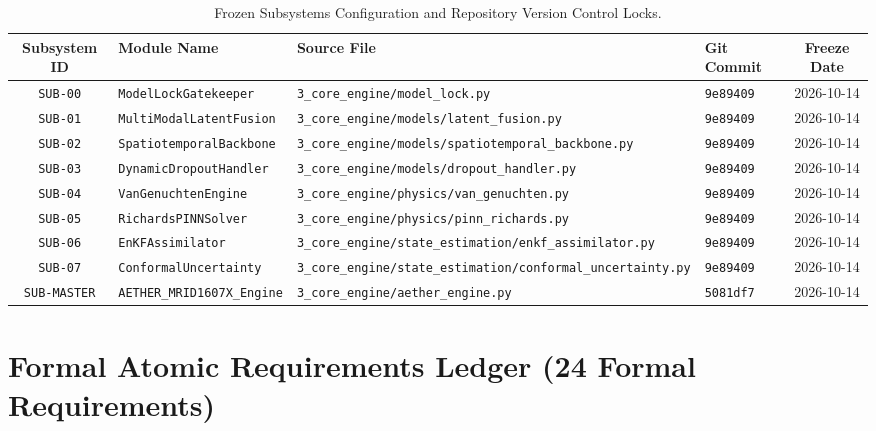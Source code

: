 \documentclass[11pt,a4paper]{article}
\theoremstyle{definition}
\theoremstyle{remark}
\begin{document}
\begin{table}[h!]
\centering
\small
\begin{tabular}{clllc}
\toprule
\textbf{Subsystem ID} & \textbf{Module Name} & \textbf{Source File} & \textbf{Git Commit} & \textbf{Freeze Date} \\
\midrule
\texttt{SUB-00} & \texttt{ModelLockGatekeeper} & \texttt{3\_core\_engine/model\_lock.py} & \texttt{9e89409} & 2026-10-14 \\
\texttt{SUB-01} & \texttt{MultiModalLatentFusion} & \texttt{3\_core\_engine/models/latent\_fusion.py} & \texttt{9e89409} & 2026-10-14 \\
\texttt{SUB-02} & \texttt{SpatiotemporalBackbone} & \texttt{3\_core\_engine/models/spatiotemporal\_backbone.py} & \texttt{9e89409} & 2026-10-14 \\
\texttt{SUB-03} & \texttt{DynamicDropoutHandler} & \texttt{3\_core\_engine/models/dropout\_handler.py} & \texttt{9e89409} & 2026-10-14 \\
\texttt{SUB-04} & \texttt{VanGenuchtenEngine} & \texttt{3\_core\_engine/physics/van\_genuchten.py} & \texttt{9e89409} & 2026-10-14 \\
\texttt{SUB-05} & \texttt{RichardsPINNSolver} & \texttt{3\_core\_engine/physics/pinn\_richards.py} & \texttt{9e89409} & 2026-10-14 \\
\texttt{SUB-06} & \texttt{EnKFAssimilator} & \texttt{3\_core\_engine/state\_estimation/enkf\_assimilator.py} & \texttt{9e89409} & 2026-10-14 \\
\texttt{SUB-07} & \texttt{ConformalUncertainty} & \texttt{3\_core\_engine/state\_estimation/conformal\_uncertainty.py} & \texttt{9e89409} & 2026-10-14 \\
\texttt{SUB-MASTER} & \texttt{AETHER\_MRID1607X\_Engine} & \texttt{3\_core\_engine/aether\_engine.py} & \texttt{5081df7} & 2026-10-14 \\
\bottomrule
\end{tabular}
\caption{Frozen Subsystems Configuration and Repository Version Control Locks.}
\label{tab:frozen_subsystems}
\end{table}

\section{Formal Atomic Requirements Ledger (24 Formal Requirements)}
\end{document}
